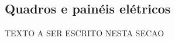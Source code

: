 \subsection{Quadros e painéis elétricos} \label{section: switchboard}
TEXTO A SER ESCRITO NESTA SECAO












